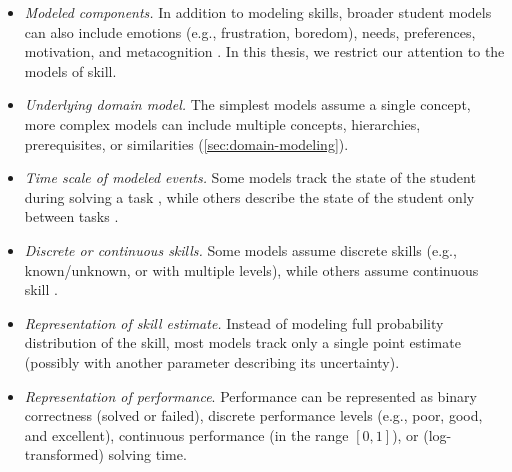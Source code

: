 \begin{itemize}
\item \emph{Modeled components.}
In addition to modeling skills, broader student models can
also include emotions (e.g., frustration, boredom), needs, preferences, motivation,
and metacognition \cite{affect-sensor-free,its-review-2010}.
In this thesis, we restrict our attention to the models of skill.
\item \emph{Underlying domain model.}
The simplest models assume a single concept,
more complex models can include multiple concepts,
hierarchies, prerequisites, or similarities (\cref{sec:domain-modeling}).
\item \emph{Time scale of modeled events.}
Some models track the state of the student during solving a task
\cite{bkt, sqltutor}, %
while others describe the state of the student only between tasks %
\cite{kli-framework}. %
\item \emph{Discrete or continuous skills.}
Some models assume discrete skills (e.g., known/unknown, or with multiple levels),
while others assume continuous skill
\cite{pelanek-learner-modeling}.
\item \emph{Representation of skill estimate.}
Instead of modeling full probability distribution of the skill, %
most models track only a single point estimate
(possibly with another parameter describing its uncertainty).
\item \emph{Representation of performance}.
  Performance can be represented as binary correctness (solved or failed),
  discrete performance levels (e.g., poor, good, and excellent),
  continuous performance (in the range $[0, 1]$),
  or (log-transformed) solving time.

\end{itemize}
